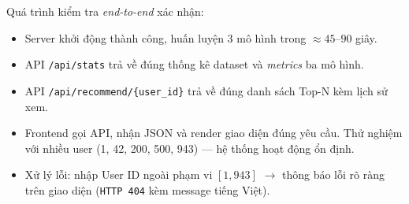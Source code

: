 ﻿\documentclass[../BTL.tex]{subfiles}
\begin{document}
Quá trình kiểm tra \textit{end-to-end} xác nhận:

\begin{itemize}[itemsep=0.3em]
    \item Server khởi động thành công, huấn luyện 3 mô hình trong
    ${\approx}45$–$90$ giây.
    \item API \texttt{/api/stats} trả về đúng thống kê dataset và
    \textit{metrics} ba mô hình.
    \item API \texttt{/api/recommend/\{user\_id\}} trả về đúng danh sách
    Top-N kèm lịch sử xem.
    \item Frontend gọi API, nhận JSON và render giao diện đúng yêu cầu.
    Thử nghiệm với nhiều user (1, 42, 200, 500, 943) — hệ thống hoạt động
    ổn định.
    \item Xử lý lỗi: nhập User ID ngoài phạm vi $[1, 943]$ $\rightarrow$ thông báo lỗi
    rõ ràng trên giao diện (\texttt{HTTP 404} kèm message tiếng Việt).
\end{itemize}
\end{document}
